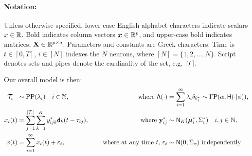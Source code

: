 
\vspace{-.12in}
\paragraph{\textbf{Notation: }}
Unless otherwise specified, lower-case English alphabet characters indicate scalars $x \in \mathbb{R}$. Bold indicates column vectors $\boldsymbol{x} \in \mathbb{R}^p$,
and upper-case bold indicates matrices, $\mathbf{X} \in \mathbb{R}^{p \times q}$.  Parameters and constants are Greek characters.  Time is $t \in [0,T]$, 
$i \in [N]$ indexes the $N$ neurons, where $[N]=\{1,2,\ldots,N\}$. Script denotes sets and pipes denote the cardinality of the set, e.g. $|\mathcal{T}|$.  
\vspace{-.1in}


Our overall model is then:
\begin{subequations}
\begin{align}
  \mc{T}_i\ \  &\sim \text{PP}(\lambda_i) \quad i \in \NN, \quad &\text{ where } \mathsf{\Lambda}(\cdot)&=\sum_{i=1}^{\infty} \lambda_i \delta_{\theta^*_i} \sim \Gamma \text{P}(\alpha, \mathsf{H}(\cdot| {\phi})), \\ %
\vspace{-.8in}
  x_i(t) &= \sum_{j = 1}^{|\mc{T}_i|}  \sum_{k = 1}^{K} y^*_{ijk} \mathsf{d}_k(t - \tau_{ij}), \quad &\text{ where }\by^*_{ij}  &\sim \mathsf{N}_K(\mb{\mu}^*_i, \Sigma^*_i) \quad i,j \in \NN, \\
  x(t)   &= \sum_{i=1}^{\infty} x_i(t) + \eps_t, \quad &\text{ where at any time $t$, } \eps_t &\sim \mathsf{N}(0,\Sigma_x) \text{ independently}
\end{align}
\end{subequations}


